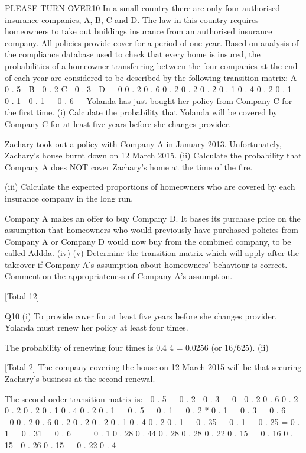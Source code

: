 \documentclass[a4paper,12pt]{article}
\begin{document}

PLEASE TURN OVER10
In a small country there are only four authorised insurance companies, A, B, C and D.
The law in this country requires homeowners to take out buildings insurance from an
authorised insurance company. All policies provide cover for a period of one year.
Based on analysis of the compliance database used to check that every home is
insured, the probabilities of a homeowner transferring between the four companies at
the end of each year are considered to be described by the following transition matrix:
A  0 . 5

B  0 . 2
C  0 . 3

D   0
0 . 2
0 . 6
0 . 2
0 . 2
0 . 2
0 . 1
0 . 4
0 . 2
0 . 1 

0 . 1 
0 . 1 

0 . 6  
Yolanda has just bought her policy from Company C for the first time.
(i)
Calculate the probability that Yolanda will be covered by Company C for at
least five years before she changes provider.

Zachary took out a policy with Company A in January 2013. Unfortunately,
Zachary’s house burnt down on 12 March 2015.
(ii) Calculate the probability that Company A does NOT cover Zachary’s home at
the time of the fire.

(iii) Calculate the expected proportions of homeowners who are covered by each
insurance company in the long run.

Company A makes an offer to buy Company D. It bases its purchase price on the
assumption that homeowners who would previously have purchased policies from
Company A or Company D would now buy from the combined company, to be called
Addda.
(iv)
(v)
Determine the transition matrix which will apply after the takeover if
Company A’s assumption about homeowners’ behaviour is correct.
Comment on the appropriateness of Company A’s assumption.


[Total 12]


Q10 (i)
To provide cover for at least five years before she changes provider, Yolanda
must renew her policy at least four times.

The probability of renewing four times is 0.4 4 = 0.0256 (or 16/625).
(ii)

[Total 2]
The company covering the house on 12 March 2015 will be that securing
Zachary’s business at the second renewal.

The second order transition matrix is:
 0 . 5

 0 . 2
 0 . 3

 0

0 . 2
0 . 6
0 . 2
0 . 2
0 . 2
0 . 1
0 . 4
0 . 2
0 . 1   0 . 5
 
0 . 1   0 . 2
*
0 . 1   0 . 3
 
0 . 6     0
0 . 2
0 . 6
0 . 2
0 . 2
0 . 2
0 . 1
0 . 4
0 . 2
0 . 1   0 . 35
 
0 . 1   0 . 25
=
0 . 1   0 . 31
 
0 . 6     0 . 1
0 . 28
0 . 44
0 . 28
0 . 28
0 . 22 0 . 15 

0 . 16 0 . 15 
0 . 26 0 . 15 

0 . 22 0 . 4  
\end{document}

